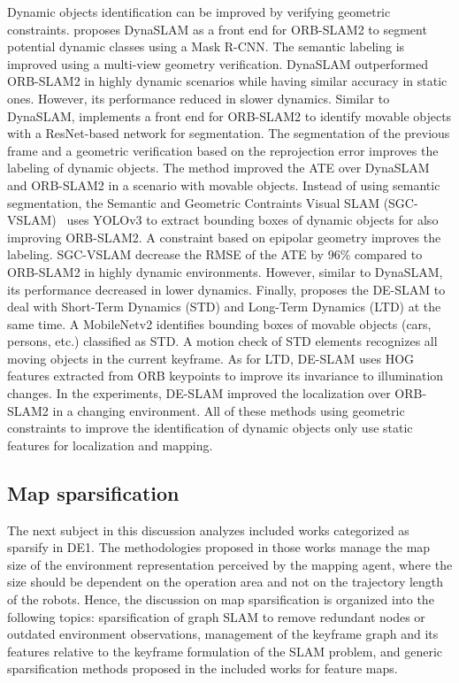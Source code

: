 Dynamic objects identification can be improved by verifying geometric constraints.
\cite{bescos-et-al:2018:2860039} proposes DynaSLAM as a front end for ORB-SLAM2 to segment potential dynamic classes using a Mask R-CNN. The semantic labeling is improved using a multi-view geometry verification. DynaSLAM outperformed ORB-SLAM2 in highly dynamic scenarios while having similar accuracy in static ones. However, its performance reduced in slower dynamics.
Similar to DynaSLAM, \cite{wang-et-al:2019:8793499} implements a front end for ORB-SLAM2 to identify movable objects with a ResNet-based network for segmentation. The segmentation of the previous frame and a geometric verification based on the reprojection error improves the labeling of dynamic objects. The method improved the ATE over DynaSLAM and ORB-SLAM2 in a scenario with movable objects.
Instead of using semantic segmentation, the Semantic and Geometric Contraints Visual SLAM (SGC-VSLAM)~\parencite{yang-et-al:2020:s20082432} uses YOLOv3 to extract bounding boxes of dynamic objects for also improving ORB-SLAM2. A constraint based on epipolar geometry improves the labeling. SGC-VSLAM decrease the RMSE of the ATE by 96\% compared to ORB-SLAM2 in highly dynamic environments. However, similar to DynaSLAM, its performance decreased in lower dynamics.
Finally, \cite{xing-et-al:2022:22062} proposes the DE-SLAM to deal with Short-Term Dynamics (STD) and Long-Term Dynamics (LTD) at the same time. A MobileNetv2 identifies bounding boxes of movable objects (cars, persons, etc.) classified as STD. A motion check of STD elements recognizes all moving objects in the current keyframe. As for LTD, DE-SLAM uses HOG features extracted from ORB keypoints to improve its invariance to illumination changes. In the experiments, DE-SLAM improved the localization over ORB-SLAM2 in a changing environment.
All of these methods using geometric constraints to improve the identification of dynamic objects only use static features for localization and mapping.





\subsection{Map sparsification}
\label{sec:discussion:sparsify}

The next subject in this discussion analyzes included works categorized as sparsify in DE1. The methodologies proposed in those works manage the map size of the environment representation perceived by the mapping agent, where the size should be dependent on the operation area and not on the trajectory length of the robots.
Hence, the discussion on map sparsification is organized into the following topics: sparsification of graph SLAM to remove redundant nodes or outdated environment observations, management of the keyframe graph and its features relative to the keyframe formulation of the SLAM problem, and generic sparsification methods proposed in the included works for feature maps.



